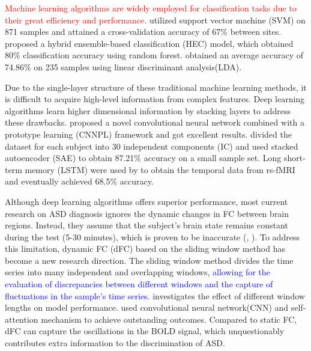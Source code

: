 \documentclass[a4paper]{cas-dc}
\begin{document}
\textcolor{red}{Machine learning algorithms are widely employed for classification tasks due to their great efficiency and performance.} \cite{abraham2017deriving} utilized support vector machine (SVM) on 871 samples and attained a cross-validation accuracy of 67\% between sites. \cite{ismail2022hec} proposed a hybrid ensemble-based classification (HEC) model, which obtained 80\% classification accuracy using random forest. \cite{song2019characterizing} obtained an average accuracy of 74.86\% on 235 samples using linear discriminant analysis(LDA).

Due to the single-layer structure of these traditional machine learning methods, it is difficult to acquire high-level information from complex features. Deep learning algorithms learn higher dimensional information by stacking layers to address these drawbacks. \cite{liang2021convolutional} proposed a novel convolutional neural network combined with a prototype learning (CNNPL) framework and got excellent results. \cite{xiao2018sae} divided the dataset for each subject into 30 independent components (IC) and used stacked autoencoder (SAE) to obtain 87.21\% accuracy on a small sample set. Long short-term memory (LSTM) were used by \cite{dvornek2017identifying} to obtain the temporal data from rs-fMRI and eventually achieved 68.5\% accuracy.

Although deep learning algorithms offers superior performance, most current research on ASD diagnosis ignores the dynamic changes in FC between brain regions. Instead, they assume that the subject's brain state remains constant during the test (5-30 minutes), which is proven to be inaccurate (\cite{calhoun2014chronnectome}, \cite{allen2014tracking}). To address this limitation, dynamic FC (dFC) based on the sliding window method has become a new research direction. The sliding window method divides the time series into many independent and overlapping windows, \textcolor{blue}{allowing for the evaluation of discrepancies between different windows and the capture of fluctuations in the sample's time series.} \cite{savva2019assessment} investigates the effect of different window lengths on model performance. \cite{litjens2017survey} used convolutional neural network(CNN) and self-attention mechanism to achieve outstanding outcomes. Compared to static FC, dFC can capture the oscillations in the BOLD signal, which unquestionably contributes extra information to the discrimination of ASD.

\end{document}
